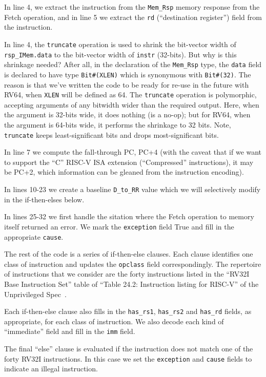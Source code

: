 In line 4, we extract the instruction from the \verb|Mem_Rsp| memory
response from the Fetch operation, and in line 5 we extract the
\verb|rd| (``destination register'') field from the instruction.


In line 4, the \verb|truncate| operation is used to shrink the
bit-vector width of \verb|rsp_IMem.data| to the bit-vector width of
\verb|instr| (32-bits).  But why is this shrinkage needed?  After all,
in the declaration of the \verb|Mem_Rsp| type, the \verb|data| field
is declared to have type \verb|Bit#(XLEN)| which is synonymous with
\verb|Bit#(32)|.  The reason is that we've written the code to be
ready for re-use in the future with RV64, when \verb|XLEN| will be
defined as 64.  The \verb|truncate| operation is polymorphic,
accepting arguments of any bitwidth wider than the required output.
Here, when the argument is 32-bits wide, it does nothing (is a no-op);
but for RV64, when the argument is 64-bits wide, it performs the
shrinkage to 32 bits.  Note, \verb|truncate| keeps least-significant
bits and drops most-significant bits.

In line 7 we compute the fall-through PC, PC+4 (with the caveat that
if we want to support the ``C'' RISC-V ISA extension (``Compressed''
instructions), it may be PC+2, which information can be gleaned from
the instruction encoding).

In lines 10-23 we create a baseline \verb|D_to_RR| value which we will
selectively modify in the if-then-elses below.

In lines 25-32 we first handle the sitation where the Fetch operation
to memory itself returned an error.  We mark the \verb|exception|
field True and fill in the appropriate \verb|cause|.

The rest of the code is a series of if-then-else clauses. Each clause
identifies one class of instruction and updates the \verb|opclass|
field correspondingly.  The repertoire of instructions that we
consider are the forty instructions listed in the ``RV32I Base
Instruction Set'' table of ``Table 24.2: Instruction listing for
RISC-V'' of the Unprivileged Spec~\cite{RISCV_Unpriv_2019_12_13}.

Each if-then-else clause also fills in the \verb|has_rs1|,
\verb|has_rs2| and \verb|has_rd| fields, as appropriate, for each
class of instruction.  We also decode each kind of ``immediate'' field
and fill in the \verb|imm| field.

The final ``else'' clause is evaluated if the instruction does not
match one of the forty RV32I instructions.  In this case we set the
\verb|exception| and \verb|cause| fields to indicate an illegal
instruction.


